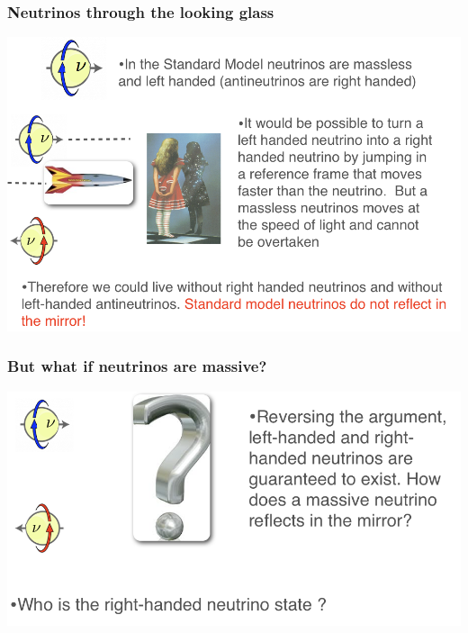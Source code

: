 \begin{frame}
\frametitle{Neutrinos through the looking glass}
\includegraphics[scale=0.33]{img/NeutrinosLookingG.png}
\end{frame}

\begin{frame}
\frametitle{But what if neutrinos are massive?}
\includegraphics[scale=0.33]{img/WhatIfNeutrinoMassive.png}
\end{frame}

